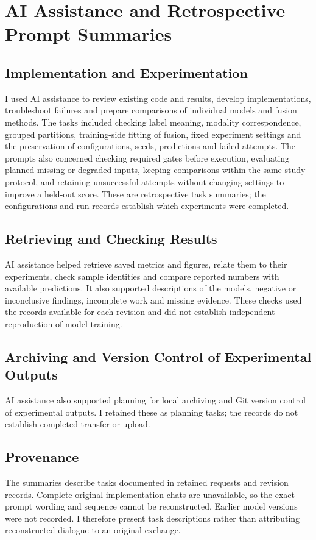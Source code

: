 \chapter{AI Assistance and Retrospective Prompt Summaries}
\label{app:prompt-record}

\section{Implementation and Experimentation}
I used AI assistance to review existing code and results, develop implementations,
troubleshoot failures and prepare comparisons of individual models and fusion methods.
The tasks included checking label meaning, modality correspondence, grouped partitions,
training-side fitting of fusion, fixed experiment settings and the preservation of
configurations, seeds, predictions and failed attempts. The prompts also concerned
checking required gates before execution, evaluating planned missing or degraded inputs,
keeping comparisons within the same study protocol, and retaining unsuccessful attempts
without changing settings to improve a held-out score. These are retrospective task
summaries; the configurations and run records establish which experiments were completed.

\section{Retrieving and Checking Results}
AI assistance helped retrieve saved metrics and figures, relate them to their
experiments, check sample identities and compare reported numbers with available
predictions. It also supported descriptions of the models, negative or inconclusive
findings, incomplete work and missing evidence. These checks used the records available
for each revision and did not establish independent reproduction of model training.

\section{Archiving and Version Control of Experimental Outputs}
\label{sec:results-archiving}
AI assistance also supported planning for local archiving and Git version control of
experimental outputs. I retained these as planning tasks; the records do not establish completed
transfer or upload.

\section{Provenance}
The summaries describe tasks documented in retained requests and revision records.
Complete original implementation chats are unavailable, so the exact prompt wording
and sequence cannot be reconstructed. Earlier model versions were not recorded.
I therefore present task descriptions rather than attributing reconstructed dialogue
to an original exchange.

